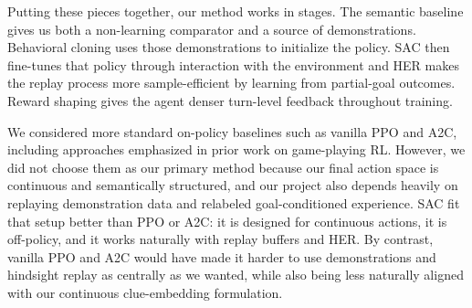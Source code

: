 \documentclass[9pt]{article}
\begin{document}
Putting these pieces together, our method works in stages. The semantic
baseline gives us both a non-learning comparator and a source of
demonstrations. Behavioral cloning uses those demonstrations to
initialize the policy. SAC then fine-tunes that policy through
interaction with the environment and HER makes the replay process more
sample-efficient by learning from partial-goal outcomes. Reward
shaping gives the agent denser turn-level feedback throughout training.

We considered more standard on-policy baselines such as vanilla PPO and
A2C, including approaches emphasized in prior work on game-playing RL.
However, we did not choose them as our primary method because our final
action space is continuous and semantically structured, and our project
also depends heavily on replaying demonstration data and relabeled
goal-conditioned experience. SAC fit that setup better than PPO or A2C:
it is designed for continuous actions, it is off-policy, and it works
naturally with replay buffers and HER. By contrast, vanilla PPO and A2C
would have made it harder to use demonstrations and hindsight replay as
centrally as we wanted, while also being less naturally aligned with our
continuous clue-embedding formulation.
\end{document}
